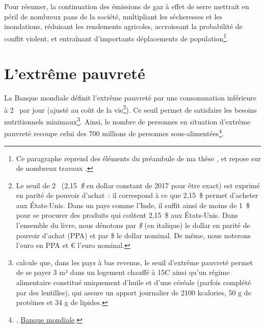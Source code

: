 \documentclass[a5paper,french,openany]{memoir}
\begin{document}
Pour résumer, la continuation des émissions de gaz à effet de serre mettrait en péril de nombreux pans de la société, multipliant les sécheresses et les inondations, réduisant les rendements agricoles, accroissant la probabilité de conflit violent, et entraînant d'importants déplacements de population\footnote{Ce paragraphe reprend des éléments du préambule de ma thèse \citep{fabre_is_2020}, et repose sur de nombreux travaux \citep{cattaneo_human_2019,carleton_social_2016,dell_temperature_2012}.}. 


\section{L'extrême pauvreté} %

La Banque mondiale définit l'extrême pauvreté par une consommation inférieure à 2~\textit{\texteuro{}} par jour (ajusté au coût de la vie\footnote{Le seuil de 2~\textit{\texteuro{}} (2,15~\textit{\$} en dollar constant de 2017 pour être exact) est exprimé en parité de pouvoir d'achat~: il correspond à ce que 2,15~\$ permet d'acheter aux États-Unis. Dans un pays comme l'Inde, il suffit ainsi de moins de 1~\$ pour se procurer des produits qui coûtent 2,15~\$ aux États-Unis. Dans l'ensemble du livre, nous dénotons par \textit{\$} (en italique) le dollar en parité de pouvoir d'achat (PPA) et par \$ le dollar nominal. De même, nous noterons \textit{\texteuro{}} l'euro en PPA et \euro{} l'euro nominal.}). %
Ce seuil permet de satisfaire les besoins nutritionnels minimaux\footnote{\citet{allen_absolute_2017} calcule que, dans les pays à bas revenus, le seuil d'extrême pauvreté permet de se payer 3 m² dans un logement chauffé à 15\textdegree{}C ainsi qu'un régime alimentaire constitué uniquement d'huile et d'une céréale (parfois complété par des lentilles), qui assure un apport journalier de 2100 kcalories, 50 g de protéines et 34 g de lipides.}. 
Ainsi, le nombre de personnes en situation d'extrême pauvreté recoupe celui des 700 millions de personnes sous-alimentées\footnote{\citet{fao_state_2023}, \href{https://data.worldbank.org/indicator/SI.POV.DDAY?end=2019&locations=MW-1W&start=1990&view=chart}{Banque mondiale}.}. 
\end{document}
